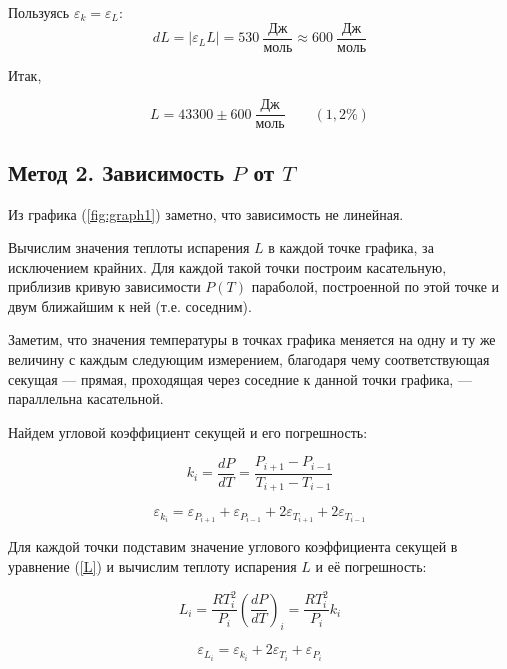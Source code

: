 \documentclass[a4paper,12pt]{article} %
\begin{document}
Пользуясь $\varepsilon_k =  \varepsilon_L$:
\begin{equation}
  dL =  |\varepsilon_L L| = 530\ \frac{\mbox{Дж}}{\mbox{моль}} \approx 600\ \frac{\mbox{Дж}}{\mbox{моль}}
\end{equation} 

Итак,

\begin{equation}
  L = 43300 \pm 600\ \frac{\mbox{Дж}}{\mbox{моль}} \qquad (1,2\%) 
\end{equation}


\subsection*{Метод 2. Зависимость $P$ от $T$}

Из графика (\ref{fig:graph1}) заметно, что зависимость не линейная. 

Вычислим значения теплоты испарения $L$ в каждой точке графика, за исключением крайних. 
Для каждой такой точки построим касательную, приблизив кривую зависимости $P(T)$ параболой, 
построенной по этой точке и двум ближайшим к ней (т.е. соседним). 

Заметим, что значения температуры в точках графика меняется на одну и ту же величину 
с каждым следующим измерением, благодаря чему соответствующая секущая — прямая, проходящая через соседние к данной точки 
графика, — параллельна касательной. 

Найдем угловой коэффициент секущей и его погрешность:

\begin{equation}
  \label{sec}
  k_i = \frac{dP}{dT} = \frac{P_{i + 1} - P_{i - 1}}{T_{i + 1} - T_{i - 1}}
\end{equation}

\begin{equation}
  \label{eps_k_i}
  \varepsilon_{k_i} = \varepsilon_{P_{i + 1}} + \varepsilon_{P_{i - 1}} + 2\varepsilon_{T_{i + 1}} + 2\varepsilon_{T_{i - 1}}
\end{equation}

Для каждой точки подставим значение углового коэффициента секущей в уравнение (\ref{L}) и вычислим теплоту испарения $L$ и её погрешность:

\begin{equation}
  L_i = \frac{RT_i^2}{P_i}\left(\frac{dP}{dT}\right)_i = \frac{RT_i^2}{P_i}k_i
\end{equation}

\begin{equation}
  \label{eps_L_i}
  \varepsilon_{L_i} = \varepsilon_{k_i} + 2\varepsilon_{T_i} + \varepsilon_{P_i} 
\end{equation}
\end{document}
